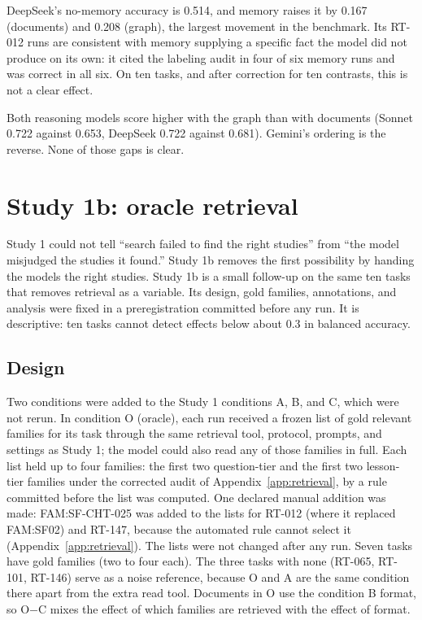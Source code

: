 \documentclass[11pt]{article}
\begin{document}
DeepSeek's no-memory accuracy is 0.514, and memory raises it by 0.167 (documents) and 0.208 (graph), the largest movement in the benchmark. Its RT-012 runs are consistent with memory supplying a specific fact the model did not produce on its own: it cited the labeling audit in four of six memory runs and was correct in all six. On ten tasks, and after correction for ten contrasts, this is not a clear effect.

Both reasoning models score higher with the graph than with documents (Sonnet 0.722 against 0.653, DeepSeek 0.722 against 0.681). Gemini's ordering is the reverse. None of those gaps is clear.

\section{Study 1b: oracle retrieval}
\label{sec:study1b}

Study 1 could not tell ``search failed to find the right studies'' from ``the model misjudged the studies it found.'' Study 1b removes the first possibility by handing the models the right studies. Study 1b is a small follow-up on the same ten tasks that removes retrieval as a variable. Its design, gold families, annotations, and analysis were fixed in a preregistration committed before any run. It is descriptive: ten tasks cannot detect effects below about 0.3 in balanced accuracy.

\subsection{Design}

Two conditions were added to the Study 1 conditions A, B, and C, which were not rerun. In condition O (oracle), each run received a frozen list of gold relevant families for its task through the same retrieval tool, protocol, prompts, and settings as Study 1; the model could also read any of those families in full. Each list held up to four families: the first two question-tier and the first two lesson-tier families under the corrected audit of Appendix~\ref{app:retrieval}, by a rule committed before the list was computed. One declared manual addition was made: FAM:SF-CHT-025 was added to the lists for RT-012 (where it replaced FAM:SF02) and RT-147, because the automated rule cannot select it (Appendix~\ref{app:retrieval}). The lists were not changed after any run. Seven tasks have gold families (two to four each). The three tasks with none (RT-065, RT-101, RT-146) serve as a noise reference, because O and A are the same condition there apart from the extra read tool. Documents in O use the condition B format, so O$-$C mixes the effect of which families are retrieved with the effect of format.
\end{document}
